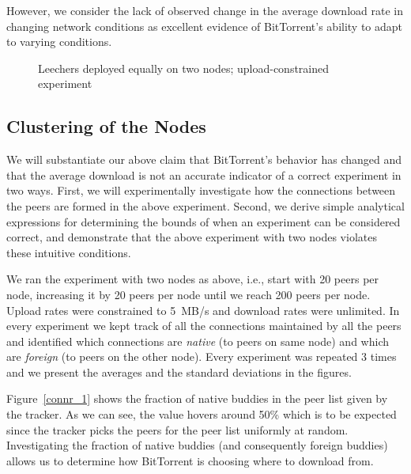 \documentclass[10pt,letterpaper,twocolumn]{article}
\begin{document}
However, we consider the lack of observed change in the average
download rate in changing network conditions as excellent evidence of
BitTorrent's ability to adapt to varying conditions. 





\begin{figure}[!tb] 
  \centering 
  \caption{Leechers deployed equally on two nodes; upload-constrained experiment}
  \label{cap_4} 
\end{figure}


\subsection{Clustering of the Nodes}
\label{cluster_nodes}

We will substantiate our above claim that BitTorrent's behavior has
changed and that the average download is not an accurate indicator of
a correct experiment in two ways. First, we will experimentally
investigate how the connections between the peers are formed in the
above experiment. Second, we derive simple analytical expressions for
determining the bounds of when an experiment can be considered
correct, and demonstrate that the above experiment with two nodes
violates these intuitive conditions.






We ran the experiment with two nodes as above, i.e., start with 20
peers per node, increasing it by 20 peers per node until we reach 200
peers per node. Upload rates were constrained to 5~MB/s and download
rates were unlimited. In every experiment we kept track of all the
connections maintained by all the peers and identified which
connections are \textit{native} (to peers on same node) and which are
\textit{foreign} (to peers on the other node). Every experiment was
repeated 3 times and we present the averages and the standard
deviations in the figures.



Figure~\ref{connr_1} shows the fraction of native buddies in the peer
list given by the tracker. As we can see, the value hovers around 50\%
which is to be expected since the tracker picks the peers for the peer
list uniformly at random. Investigating the fraction of native buddies
(and consequently foreign buddies) allows us to determine how
BitTorrent is choosing where to download from.
\end{document}
